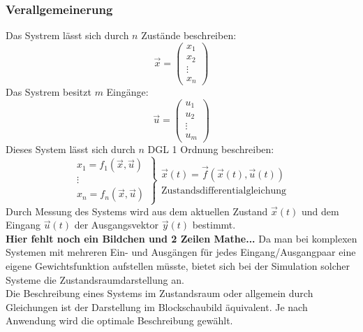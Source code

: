 \documentclass[12pt,a4paper,ngerman]{scrartcl}
\begin{document}
\subsubsection*{Verallgemeinerung}

Das Systrem lässt sich durch $n$ Zustände beschreiben:
\[
\vec{x}=
\begin{pmatrix}
x_1\\
x_2\\
\vdots\\
x_n
\end{pmatrix}
\]
Das Systrem besitzt $m$ Eingänge:
\[
\vec{u}=
\begin{pmatrix}
u_1\\
u_2\\
\vdots\\
u_m
\end{pmatrix}
\]
Dieses System lässt sich durch $n$ DGL 1 Ordnung beschreiben:
\[
\left.
\begin{array}{cc}
x_1=f_1(\vec{x},\vec{u})\\
\vdots\\
x_n=f_n(\vec{x},\vec{u})
\end{array}
\right\}
\begin{array}{ll}
\vec{x}(t)=\vec{f}(\vec{x}(t),\vec{u}(t))\\
\text{Zustandsdifferentialgleichung}
\end{array}
\]
Durch Messung des Systems wird aus dem aktuellen Zustand $\vec{x}(t)$ und dem Eingang $\vec{u}(t)$ der Ausgangsvektor $\vec{y}(t)$ bestimmt.\\
\textbf{Hier fehlt noch ein Bildchen und 2 Zeilen Mathe...}
Da man bei komplexen Systemen mit mehreren Ein- und Ausgängen für jedes Eingang/Ausgangpaar eine eigene Gewichtsfunktion aufstellen müsste, bietet sich bei der Simulation solcher Systeme die Zustandsraumdarstellung an.\\  
Die Beschreibung eines Systems im Zustandsraum oder allgemein durch Gleichungen ist der Darstellung im Blockschaubild äquivalent. Je nach Anwendung wird die optimale Beschreibung gewählt. 
\end{document}
